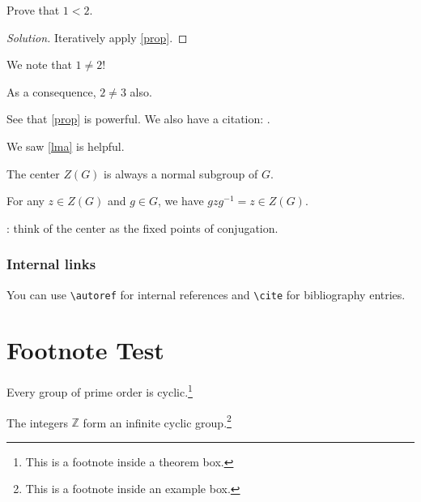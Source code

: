 \begin{exercise}
	Prove that \(1 < 2\).
\end{exercise}
\begin{proof}[Solution]
	Iteratively apply \autoref{prop}.
\end{proof}

\begin{eg}\label{eg}
	We note that \(1 \neq 2\)!
	\begin{note}
		As a consequence, \(2 \neq 3\) also.
	\end{note}
\end{eg}

\begin{remark}
	See that \autoref{prop} is powerful. We also have a citation: \cite{newton1726philosophiae}.
\end{remark}

\begin{prev}
	We saw \autoref{lma} is helpful.
\end{prev}

\begin{claim}
	The center \(Z(G)\) is always a normal subgroup of \(G\).
\end{claim}
\begin{subproof}
	For any \(z \in Z(G)\) and \(g \in G\), we have \(gzg^{-1} = z \in Z(G)\).
\end{subproof}

\begin{intuition}
	: think of the center as the fixed points of conjugation.
\end{intuition}

\subsubsection{Internal links}
You can use \texttt{\textbackslash autoref} for internal references and \texttt{\textbackslash cite} for bibliography entries.

\section{Footnote Test}

\begin{theorem}
	Every group of prime order is cyclic.\footnote{This is a footnote inside a theorem box.}
\end{theorem}

\begin{eg}
	The integers \(\mathbb{Z}\) form an infinite cyclic group.\footnote{This is a footnote inside an example box.}
\end{eg}

